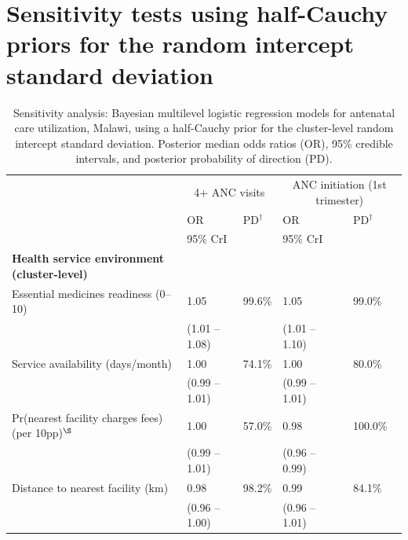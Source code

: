 \chapter{Sensitivity tests using half-Cauchy priors for the random intercept standard deviation}
\label{appx:half-cauchy}

\begin{table}[H]
\centering
\begin{threeparttable}

\singlespacing    
\caption*{Sensitivity analysis: Bayesian multilevel logistic regression models for antenatal care utilization, Malawi, using a half-Cauchy prior for the cluster-level random intercept standard deviation. Posterior median odds ratios (OR), 95\% credible intervals, and posterior probability of direction (PD).}
\label{tbl:app_anc_models_halfcauchy_mw}
{\fontsize{11pt}{13.2pt}\selectfont
\begin{tabular}{l ll ll}
\hline
\hline
 & \multicolumn{2}{c}{4+ ANC visits} & \multicolumn{2}{c}{ANC initiation (1st trimester)} \\
 & OR & PD$^{\dagger}$ & OR & PD$^{\dagger}$ \\
 & 95\% CrI &  & 95\% CrI &  \\
\hline

\textbf{Health service environment (cluster-level)} & & & & \\
\hspace{2pt} Essential medicines readiness (0--10) & 1.05 & 99.6\% & 1.05 & 99.0\% \\
 & (1.01 -- 1.08) & & (1.01 -- 1.10) & \\
\hspace{2pt} Service availability (days/month) & 1.00 & 74.1\% & 1.00 & 80.0\% \\
 & (0.99 -- 1.01) & & (0.99 -- 1.01) & \\
\hspace{2pt} Pr(nearest facility charges fees) (per 10pp)$^{\S}$ & 1.00 & 57.0\% & 0.98 & 100.0\% \\
 & (0.99 -- 1.01) & & (0.96 -- 0.99) & \\
\hspace{2pt} Distance to nearest facility (km) & 0.98 & 98.2\% & 0.99 & 84.1\% \\
 & (0.96 -- 1.00) & & (0.96 -- 1.01) & \\


\end{tabular}}
\end{threeparttable}
\end{table}
